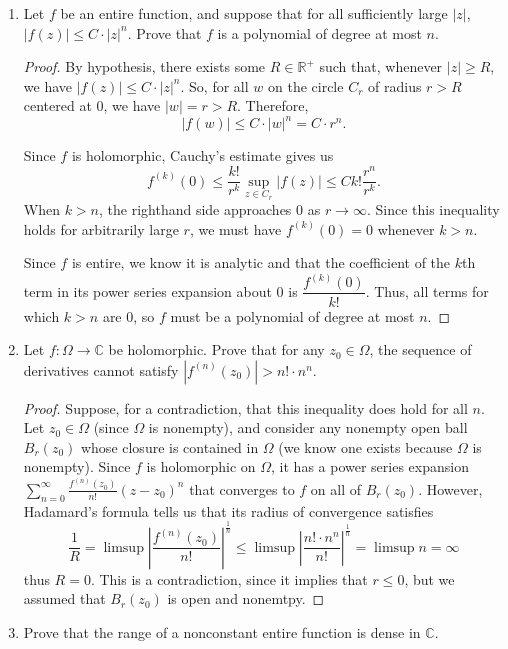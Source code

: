 \documentclass[10pt]{article}
\newcommand{\R}{\mathbb{R}}
\newcommand{\C}{\mathbb{C}}
\begin{document}
\begin{enumerate}
\begin{proof}
For the reverse direction, suppose $f_n \rightarrow f$ uniformly on compact sets.  Let $z \in \Omega$.  Since $\Omega$ is open, there is some closed ball $B_r(z)$ of radius $r$, centered at $z$, that is contained within $\Omega$.  Closed balls are compact, so $f_n \rightarrow f$ uniformly on $B_r(z)$.  In particular, this occurs on the open ball of radius $\frac{r}{2}$ around $z$, which is an open neighborhood of $z$.  So $f_n \rightarrow f$ locally uniformly.
\end{proof}

\item Let $f$ be an entire function, and suppose that for all sufficiently large $|z|$, $|f(z)| \leq C \cdot |z|^n$.  Prove that $f$ is a polynomial of degree at most $n$.

\begin{proof}
By hypothesis, there exists some $R \in \R^+$ such that, whenever $|z| \geq R$, we have $|f(z)| \leq C \cdot |z|^n$.  So, for all $w$ on the circle $C_r$ of radius $r > R$ centered at $0$, we have $|w| = r > R$.  Therefore,
$$
|f(w)| \leq C \cdot |w|^n = C \cdot r^n.
$$

Since $f$ is holomorphic, Cauchy's estimate gives us
$$
f^{(k)}(0) \leq \frac{k!}{r^k} \sup\limits_{z \in C_r} |f(z)| \leq Ck!\frac{r^n}{r^k}.
$$
When $k > n$, the righthand side approaches 0 as $r \rightarrow \infty$.  Since this inequality holds for arbitrarily large $r$, we must have $f^{(k)}(0) = 0$ whenever $k > n$.

Since $f$ is entire, we know it is analytic and that the coefficient of the $k$th term in its power series expansion about $0$ is $\dfrac{f^{(k)}(0)}{k!}$.  Thus, all terms for which $k > n$ are 0, so $f$ must be a polynomial of degree at most $n$.
\end{proof}

\item Let $f: \Omega \rightarrow \C$ be holomorphic.  Prove that for any $z_0 \in \Omega$, the sequence of derivatives cannot satisfy $|f^{(n)}(z_0)| > n! \cdot n^n$.

\begin{proof}
Suppose, for a contradiction, that this inequality does hold for all $n$.  Let $z_0 \in \Omega$ (since $\Omega$ is nonempty), and consider any nonempty open ball $B_{r}(z_0)$ whose closure is contained in $\Omega$ (we know one exists because $\Omega$ is nonempty).  Since $f$ is holomorphic on $\Omega$, it has a power series expansion $\sum\limits_{n=0}^\infty \frac{f^{(n)}(z_0)}{n!}(z-z_0)^n$ that converges to $f$ on all of $B_{r}(z_0)$.  However, Hadamard's formula tells us that its radius of convergence satisfies
$$
\frac{1}{R} = \limsup \left| \frac{f^{(n)}(z_0)}{n!} \right|^{\frac{1}{n}}
\leq
\limsup \left| \frac{n! \cdot n^n}{n!} \right|^{\frac{1}{n}} = \limsup n = \infty
$$
thus $R = 0$.  This is a contradiction, since it implies that $r \leq 0$, but we assumed that $B_r(z_0)$ is open and nonemtpy.
\end{proof}
\pagebreak
\item Prove that the range of a nonconstant entire function is dense in $\C$.


\end{enumerate}
\end{document}
